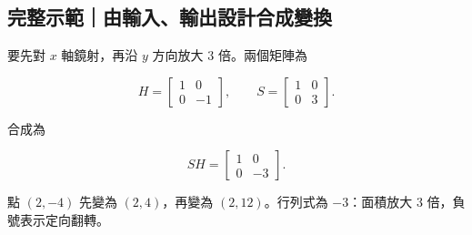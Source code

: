 \documentclass[11pt,a4paper]{article}
\begin{document}
\begin{HandoutWorkedExample}

\subsection{完整示範｜由輸入、輸出設計合成變換}\label{ux5b8cux6574ux793aux7bc4ux7531ux8f38ux5165ux8f38ux51faux8a2dux8a08ux5408ux6210ux8b8aux63db}

要先對 \(x\) 軸鏡射，再沿 \(y\) 方向放大 \(3\) 倍。兩個矩陣為

\[
H=\begin{bmatrix}1&0\\0&-1\end{bmatrix},
\qquad
S=\begin{bmatrix}1&0\\0&3\end{bmatrix}.
\]

合成為

\[
SH=\begin{bmatrix}1&0\\0&-3\end{bmatrix}.
\]

點 \((2,-4)\) 先變為 \((2,4)\)，再變為 \(\boxed{(2,12)}\)。行列式為 \(-3\)：面積放大 \(3\) 倍，負號表示定向翻轉。

\end{HandoutWorkedExample}
\end{document}

